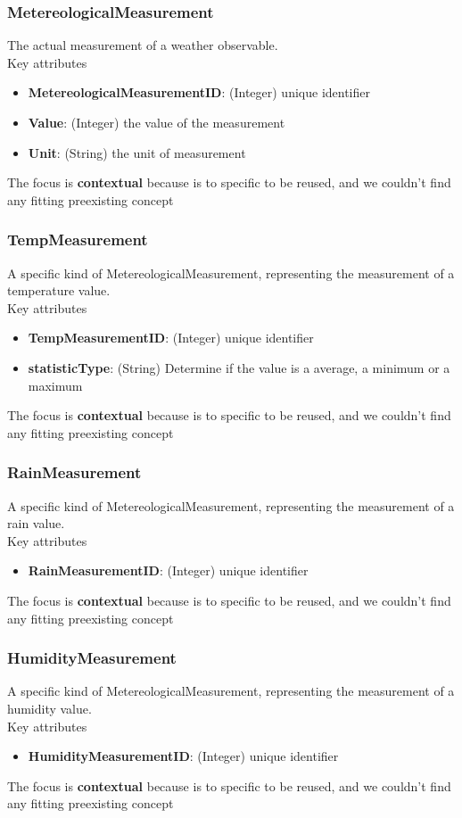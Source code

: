 \subsubsection{MetereologicalMeasurement}
The actual measurement of a weather observable.\\
Key attributes
\begin{itemize}
    \item \textbf{MetereologicalMeasurementID}: (Integer) unique identifier
    \item \textbf{Value}: (Integer) the value of the measurement
    \item \textbf{Unit}: (String) the unit of measurement
\end{itemize}
The focus is \textbf{contextual} because is to specific to be reused, and we couldn't find any fitting preexisting concept 
\subsubsection{TempMeasurement}
A specific kind of MetereologicalMeasurement, representing the measurement of a temperature value.\\
Key attributes
\begin{itemize}
    \item \textbf{TempMeasurementID}: (Integer) unique identifier
    \item \textbf{statisticType}: (String) Determine if the value is a average, a minimum or a maximum
\end{itemize}
The focus is \textbf{contextual} because is to specific to be reused, and we couldn't find any fitting preexisting concept
\subsubsection{RainMeasurement}
A specific kind of MetereologicalMeasurement, representing the measurement of a rain value.\\
Key attributes
\begin{itemize}
    \item \textbf{RainMeasurementID}: (Integer) unique identifier
\end{itemize}
The focus is \textbf{contextual} because is to specific to be reused, and we couldn't find any fitting preexisting concept
\subsubsection{HumidityMeasurement}
A specific kind of MetereologicalMeasurement, representing the measurement of a humidity value.\\
Key attributes
\begin{itemize}
    \item \textbf{HumidityMeasurementID}: (Integer) unique identifier
\end{itemize}
The focus is \textbf{contextual} because is to specific to be reused, and we couldn't find any fitting preexisting concept
